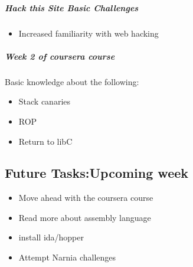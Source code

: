 \documentclass{article}
\begin{document}
\subparagraph{Hack this Site Basic Challenges}
    \begin{itemize}
    \item Increased familiarity with web hacking
    \end{itemize} 
\subparagraph{Week 2 of coursera course}
    Basic knowledge about the following:
    \begin{itemize}
    \item Stack canaries
    \item ROP
    \item Return to libC
    \end{itemize} 
    
\subsection*{Future Tasks:Upcoming week}
\begin{itemize}
    \item Move ahead with the coursera course
    \item Read more about assembly language
    \item install ida/hopper
    \item Attempt Narnia challenges
\end{itemize}
\end{document}
